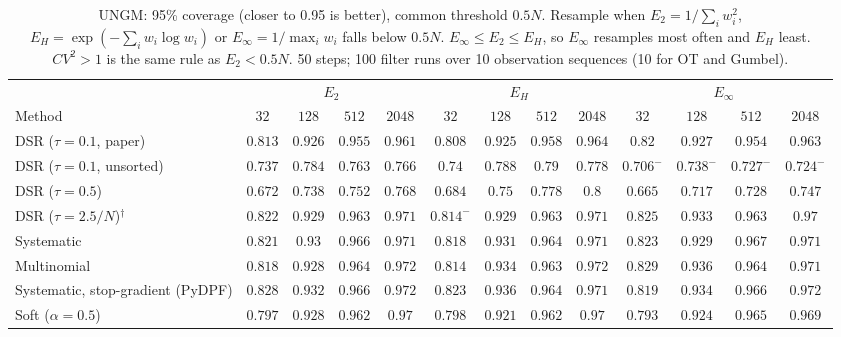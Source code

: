 \begin{table}[ht]
\centering
\small
\caption{UNGM: 95\% coverage (closer to 0.95 is better), common threshold $0.5N$. Resample when $E_2=1/\sum_iw_i^2$, $E_H=\exp(-\sum_iw_i\log w_i)$ or $E_\infty=1/\max_iw_i$ falls below $0.5N$. $E_\infty\le E_2\le E_H$, so $E_\infty$ resamples most often and $E_H$ least. $CV^2>1$ is the same rule as $E_2<0.5N$. 50 steps; 100 filter runs over 10 observation sequences (10 for OT and Gumbel).}
\label{tab:trigger-fixed-ungm-coverage95}
\begin{adjustbox}{max width=\linewidth}
\begin{tabular}{lcccc|cccc|cccc}
\toprule
 & \multicolumn{4}{c}{$E_2$} & \multicolumn{4}{c}{$E_H$} & \multicolumn{4}{c}{$E_\infty$} \\
\cmidrule(lr){2-5} \cmidrule(lr){6-9} \cmidrule(lr){10-13}
Method & $32$ & $128$ & $512$ & $2048$ & $32$ & $128$ & $512$ & $2048$ & $32$ & $128$ & $512$ & $2048$ \\
\midrule
DSR ($\tau{=}0.1$, paper) & $0.813$ & $0.926$ & $0.955$ & $\mathbf{0.961}$ & $0.808$ & $0.925$ & $0.958$ & $0.964$ & $\mathbf{0.82}$ & $\mathbf{0.927}$ & $\mathbf{0.954}$ & $0.963$ \\
DSR ($\tau{=}0.1$, unsorted) & $0.737$ & $0.784$ & $0.763$ & $0.766$ & $\mathbf{0.74}$ & $\mathbf{0.788}$ & $\mathbf{0.79}$ & $\mathbf{0.778}$ & $0.706^{-}$ & $0.738^{-}$ & $0.727^{-}$ & $0.724^{-}$ \\
DSR ($\tau{=}0.5$) & $0.672$ & $0.738$ & $0.752$ & $0.768$ & $\mathbf{0.684}$ & $\mathbf{0.75}$ & $\mathbf{0.778}$ & $\mathbf{0.8}$ & $0.665$ & $0.717$ & $0.728$ & $0.747$ \\
DSR ($\tau{=}2.5/N$)$^\dagger$ & $0.822$ & $0.929$ & $0.963$ & $0.971$ & $0.814^{-}$ & $0.929$ & $\mathbf{0.963}$ & $0.971$ & $\mathbf{0.825}$ & $\mathbf{0.933}$ & $0.963$ & $\mathbf{0.97}$ \\
\midrule
Systematic & $0.821$ & $0.93$ & $0.966$ & $0.971$ & $0.818$ & $\mathbf{0.931}$ & $\mathbf{0.964}$ & $\mathbf{0.971}$ & $\mathbf{0.823}$ & $0.929$ & $0.967$ & $0.971$ \\
Multinomial & $0.818$ & $0.928$ & $0.964$ & $0.972$ & $0.814$ & $0.934$ & $\mathbf{0.963}$ & $0.972$ & $\mathbf{0.829}$ & $\mathbf{0.936}$ & $0.964$ & $\mathbf{0.971}$ \\
Systematic, stop-gradient (PyDPF) & $\mathbf{0.828}$ & $0.932$ & $0.966$ & $0.972$ & $0.823$ & $\mathbf{0.936}$ & $\mathbf{0.964}$ & $\mathbf{0.971}$ & $0.819$ & $0.934$ & $0.966$ & $0.972$ \\
Soft ($\alpha{=}0.5$) & $0.797$ & $\mathbf{0.928}$ & $\mathbf{0.962}$ & $0.97$ & $\mathbf{0.798}$ & $0.921$ & $\mathbf{0.962}$ & $0.97$ & $0.793$ & $0.924$ & $0.965$ & $\mathbf{0.969}$ \\

\end{tabular}
\end{adjustbox}
\end{table}
